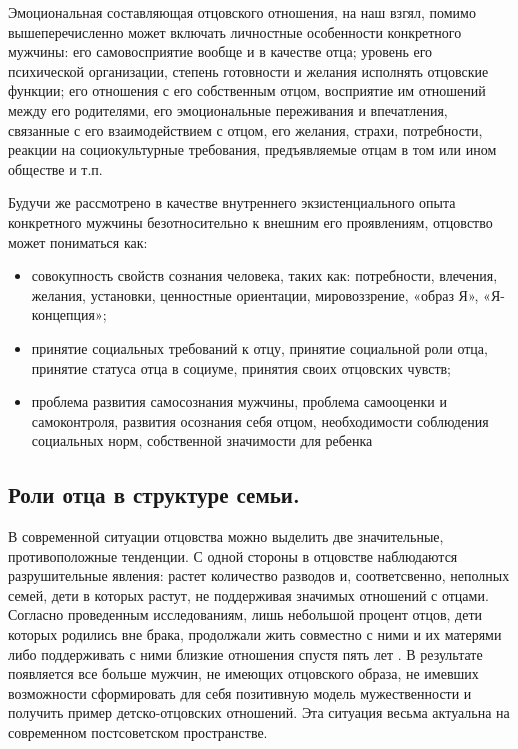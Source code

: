 \documentclass{../../common/thesisbyxetex}
\begin{document}
Эмоциональная составляющая отцовского отношения, на наш взгял, помимо вышеперечисленно может
включать личностные особенности конкретного мужчины: его самовосприятие вообще и в качестве отца;
уровень его психической организации, степень готовности и желания исполнять отцовские функции;
его отношения с его собственным отцом, восприятие им отношений между его родителями, его
эмоциональные переживания и впечатления, связанные с его взаимодействием с отцом, его желания,
страхи, потребности, реакции на социокультурные требования, предъявляемые отцам в том или ином
обществе и т.п.

Будучи же рассмотрено в качестве внутреннего экзистенциального опыта
конкретного мужчины безотносительно к внешним его проявлениям, отцовство может пониматься как:

\begin{itemize}
	\item  совокупность свойств сознания человека, таких
как: потребности, влечения, желания, установки, ценностные ориентации,
мировоззрение, «образ Я», «Я-концепция»;

\item принятие социальных требований к отцу, принятие социальной роли отца, принятие статуса отца в
социуме, принятия своих отцовских чувств;

\item проблема развития самосознания мужчины, проблема самооценки и самоконтроля, развития осознания
себя отцом, необходимости соблюдения социальных норм, собственной значимости для ребенка
\cite{psyot}
\end{itemize}



\subsection{Роли отца в структуре семьи.}


В современной ситуации отцовства можно выделить две значительные, противоположные
тенденции. С одной стороны  в отцовстве наблюдаются разрушительные явления: растет количество
разводов и, соответсвенно, неполных семей, дети в которых растут, не поддерживая значимых отношений
с отцами. Согласно проведенным исследованиям, лишь небольшой процент отцов, дети которых
родились вне брака, продолжали жить совместно с ними и их матерями либо поддерживать с ними близкие
отношения спустя пять лет \cite{long}. В результате появляется все больше мужчин, не имеющих
отцовского образа, не имевших возможности сформировать для себя позитивную модель мужественности и
получить пример детско-отцовских отношений. Эта ситуация весьма актуальна на современном
постсоветском пространстве.
\end{document}

